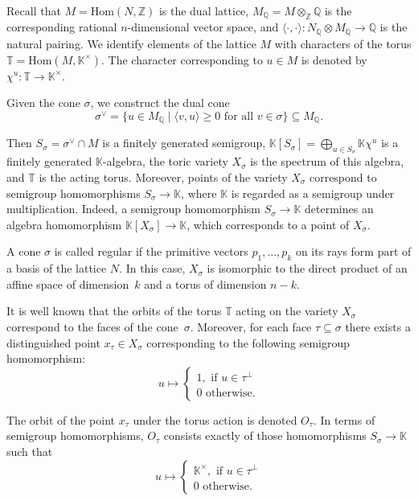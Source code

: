 \documentclass[a4paper, 11pt]{amsart}
\theoremstyle{plain}
\theoremstyle{remark}
\theoremstyle{definition}
\newcommand{\KK}{\mathbb{K}}
\newcommand{\TT}{\mathbb{T}}
\begin{document}
Recall that $M = \text{Hom}(N, \mathbb{Z})$ is the dual lattice, $M_{\mathbb{Q}} = M \otimes_{\mathbb{Z}} \mathbb{Q}$ is the corresponding rational $n$-dimensional vector space, and $\langle \cdot, \cdot \rangle\colon N_{\mathbb{Q}} \otimes M_{\mathbb{Q}} \rightarrow \mathbb{Q}$ is the natural pairing. We identify elements of the lattice $M$ with characters of the torus $\TT = \text{Hom}(M, \KK^\times)$. The character corresponding to $u \in M$ is denoted by $\chi^u\colon \TT \rightarrow \KK^\times$.

Given the cone $\sigma$, we construct the dual cone $$\sigma^\vee = \{u \in M_{\mathbb{Q}} \mid \langle v, u \rangle \geq 0 \text{ for all } v \in \sigma\} \subseteq M_{\mathbb{Q}}.$$

Then $S_\sigma = \sigma^\vee \cap M$ is a finitely generated semigroup, $\KK[S_\sigma] = \bigoplus_{u \in S_\sigma} \KK \chi^u$ is a finitely generated $\KK$-algebra, the toric variety $X_\sigma$ is the spectrum of this algebra, and $\TT$ is the acting torus. Moreover, points of the variety $X_\sigma$ correspond to semigroup homomorphisms $S_\sigma \rightarrow \KK$, where $\KK$ is regarded as a semigroup under multiplication. Indeed, a semigroup homomorphism $S_\sigma \rightarrow \KK$ determines an algebra homomorphism $\KK[X_\sigma] \rightarrow \KK$, which corresponds to a point of $X_\sigma$.

A cone $\sigma$ is called regular if the primitive vectors $p_1, \ldots, p_k$ on its rays form part of a basis of the lattice $N$. In this case, $X_\sigma$ is isomorphic to the direct product of an affine space of dimension~$k$ and a torus of dimension $n-k$.

It is well known that the orbits of the torus $\TT$ acting on the variety $X_\sigma$ correspond to the faces of the cone~$\sigma$. Moreover, for each face $\tau \subseteq \sigma$ there exists a distinguished point $x_\tau \in X_\sigma$ corresponding to the following semigroup homomorphism:
\begin{equation}\label{tor:fun_orb}
	u \mapsto \begin{cases} 
		1, \text{ if } u \in \tau^\perp\\
		0 \text{ otherwise.} 
	\end{cases}
\end{equation} 

The orbit of the point $x_\tau$ under the torus action is denoted $O_\tau$. In terms of semigroup homomorphisms, $O_\tau$ consists exactly of those homomorphisms $S_\sigma \rightarrow \KK$ such that 
\begin{equation}\label{tor:fun_orb2}
	u \mapsto \begin{cases} 
		\KK^\times, \text{ if } u \in \tau^\perp\\
		0 \text{ otherwise.} 
	\end{cases}
\end{equation}
\end{document}
